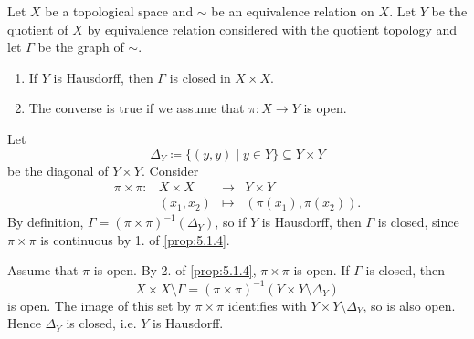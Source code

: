 \begin{propositionenv}\label{prop:5.1.6}
    Let $X$ be a topological space and $\sim$ be an equivalence relation on $X$.
    Let $Y$ be the quotient of $X$ by equivalence relation considered with the quotient topology and let $\Gamma$ be the graph of $\sim$.
    \begin{enumerate}
        \item If $Y$ is Hausdorff, then $\Gamma$ is closed in $X \times X$.
        \item The converse is true if we assume that $\pi : X\rightarrow Y$ is open.
    \end{enumerate}
\end{propositionenv}
\begin{proofenv}
    Let
    $$ \Delta_Y \coloneq \{(y,y)\mid y \in Y\} \subseteq Y \times Y$$
    be the diagonal of $Y\times Y$.
    Consider
    $$\begin{array}{rrcl}
        \pi \times \pi : & X \times X & \longrightarrow & Y \times Y\\
        & \left(x_1,x_2\right) & \longmapsto & \left(\pi(x_1),\pi(x_2)\right).
    \end{array}$$
    By definition, $\Gamma = \left(\pi \times \pi\right)^{-1} \left(\Delta_Y\right)$, so if $Y$ is Hausdorff, then $\Gamma$ is closed, since $\pi \times \pi$ is continuous by 1. of \ref{prop:5.1.4}.

    \quad Assume that $\pi$ is open.
    By 2. of \ref{prop:5.1.4}, $\pi \times \pi$ is open.
    If $\Gamma$ is closed, then
    $$ X\times X \setminus \Gamma = \left(\pi \times \pi\right)^{-1} \left(Y \times Y \setminus \Delta_Y\right)$$
    is open.
    The image of this set by $\pi \times \pi$ identifies with $Y \times Y \setminus \Delta_Y$, so is also open.
    Hence $\Delta_Y$ is closed, i.e. $Y$ is Hausdorff.
\end{proofenv}

